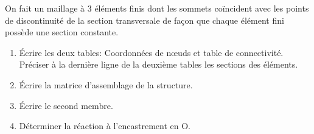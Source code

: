 \documentclass{article}
\begin{document}
On fait un maillage à 3 éléments finis dont les sommets coïncident avec les points de discontinuité de la section transversale de façon que chaque élément fini possède une section constante. 
\begin{enumerate}
\item Écrire les deux tables: Coordonnées de nœuds et table de connectivité. Préciser à la dernière ligne de la deuxième tables les sections des éléments.
\item Écrire la matrice d'assemblage de la structure.
%
\item Écrire le second membre.
\item  Déterminer la réaction à l'encastrement en O.
\end{enumerate}
 
\end{document}
